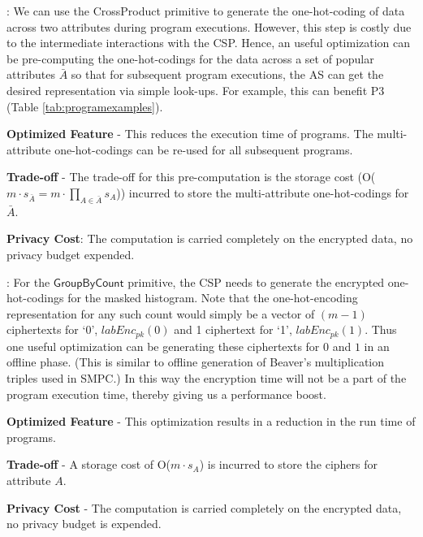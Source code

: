 :  
We can use the \textsf{CrossProduct} primitive to generate the one-hot-coding of data across two attributes during program executions. However, this step is costly due to the intermediate interactions with the \textsf{CSP}. Hence, an  useful optimization can be  pre-computing the one-hot-codings for the data across a set of popular attributes $\bar{A}$ so that for subsequent program executions, the \textsf{AS} can get the desired representation via simple look-ups. For example, this can benefit P3 (Table \ref{tab:programexamples}).
\squishlist
\item \textbf{Optimized Feature} - This reduces the execution time of \system programs. The multi-attribute one-hot-codings can be re-used for all subsequent programs.
\item  \textbf{Trade-off} - The trade-off for this pre-computation is the storage cost (O($m\cdot s_{\bar{A}}=m\cdot \prod_{A \in \bar{A}}s_A$)) incurred to store the multi-attribute one-hot-codings for $\bar{A}$.
\item \textbf{Privacy Cost}: The computation is carried completely on the encrypted data, no privacy budget expended.
\squishend

:
For the $\textsf{GroupByCount}$ primitive, the \textsf{CSP} needs to generate the encrypted one-hot-codings for the masked histogram. Note that the one-hot-encoding representation for any such count would simply be a vector of $(m-1)$ ciphertexts for `0', $labEnc_{pk}(0)$ and 1 ciphertext for `1', $labEnc_{pk}(1)$. Thus one useful optimization can be generating these ciphertexts for $0$ and $1$ in an offline phase. (This is similar to offline generation of Beaver's multiplication triples \cite{Beaver} used in SMPC.) In this way the encryption time will not be a part of the program execution time, thereby giving us a performance boost.
\squishlist
\item \textbf{Optimized Feature} - This optimization results in a reduction in the run time of \system programs. 
\item \textbf{Trade-off} - A storage cost of O($m\cdot s_A$) is incurred to store the ciphers for attribute $A$.
\item \textbf{Privacy Cost} - The computation is carried completely on the encrypted data, no privacy  budget is expended.
\squishend


